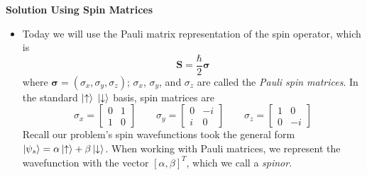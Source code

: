 \documentclass[11pt, a4paper]{article}
\renewcommand{\vec}[1]{\bm{#1}} %
\newcommand{\ua}{\uparrow}  %
\newcommand{\da}{\downarrow}  %
\begin{document}
\textbf{Solution Using Spin Matrices}
\begin{itemize}
	\item  Today we will use the Pauli matrix representation of the spin operator, which is
	\begin{equation*}
		\vec{S} = \frac{\hbar}{2}\vec{\sigma}
	\end{equation*}
	where $ \vec{\sigma} = (\sigma_{x}, \sigma_{y}, \sigma_{z})$; $ \sigma_{x}$, $\sigma_{y}$, and $ \sigma_{z} $ are called the \textit{Pauli spin matrices}. In the standard $ \ket{\ua}$ $\ket{\da} $ basis, spin matrices are
	\begin{equation*}
		\sigma_{x} = 
		\begin{bmatrix}
			0 & 1\\
			1 & 0
		\end{bmatrix}
		\qquad
		\sigma_{y} = 
		\begin{bmatrix}
			0 & -i\\
			i & 0
		\end{bmatrix}
		\qquad
		\sigma_{z} = 
		\begin{bmatrix}
			1 & 0\\
			0 & -i
		\end{bmatrix}
	\end{equation*}
	Recall our problem's spin wavefunctions took the general form $ \ket{\psi_{s}} = \alpha \ket{\ua} + \beta \ket{\da} $. When working with Pauli matrices, we represent the wavefunction with the vector $ [\alpha, \beta]^{T} $, which we call a \textit{spinor}.
	

\end{itemize}
\end{document}
